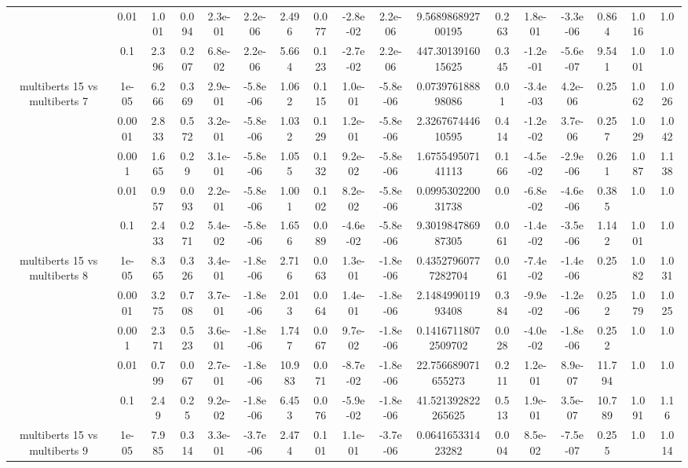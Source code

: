 \begin{tabular}{|c|c|c|c|c|c|c|c|c|c|c|c|c|c|c|c|c|}
 & 0.01 & 1.001 & 0.094 & 2.3e-01 & 2.2e-06 & 2.496 & 0.077 & -2.8e-02 & 2.2e-06 & 9.568986892700195 & 0.263 & 1.8e-01 & -3.3e-06 & 0.864 & 1.016 & 1.0 \\
 & 0.1 & 2.396 & 0.207 & 6.8e-02 & 2.2e-06 & 5.664 & 0.123 & -2.7e-02 & 2.2e-06 & 447.3013916015625 & 0.345 & -1.2e-01 & -5.6e-07 & 9.541 & 1.001 & 1.0 \\
\hline
\multirow{5}{*}{multiberts 15 vs multiberts 7} & 1e-05 & 6.266 & 0.369 & 2.9e-01 & -5.8e-06 & 1.062 & 0.115 & 1.0e-01 & -5.8e-06 & 0.073976188898086 & 0.01 & -3.4e-03 & 4.2e-06 & 0.25 & 1.062 & 1.026 \\
 & 0.0001 & 2.833 & 0.572 & 3.2e-01 & -5.8e-06 & 1.032 & 0.129 & 1.2e-01 & -5.8e-06 & 2.326767444610595 & 0.414 & -1.2e-02 & 3.7e-06 & 0.257 & 1.029 & 1.042 \\
 & 0.001 & 1.665 & 0.29 & 3.1e-01 & -5.8e-06 & 1.055 & 0.132 & 9.2e-02 & -5.8e-06 & 1.675549507141113 & 0.166 & -4.5e-02 & -2.9e-06 & 0.261 & 1.087 & 1.138 \\
 & 0.01 & 0.957 & 0.093 & 2.2e-01 & -5.8e-06 & 1.001 & 0.102 & 8.2e-02 & -5.8e-06 & 0.099530220031738 & 0.0 & -6.8e-02 & -4.6e-06 & 0.385 & 1.0 & 1.0 \\
 & 0.1 & 2.433 & 0.271 & 5.4e-02 & -5.8e-06 & 1.656 & 0.089 & -4.6e-02 & -5.8e-06 & 9.301984786987305 & 0.061 & -1.4e-02 & -3.5e-06 & 1.142 & 1.001 & 1.0 \\
\hline
\multirow{5}{*}{multiberts 15 vs multiberts 8} & 1e-05 & 8.365 & 0.326 & 3.4e-01 & -1.8e-06 & 2.716 & 0.063 & 1.3e-01 & -1.8e-06 & 0.43527960777282704 & 0.061 & -7.4e-02 & -1.4e-06 & 0.25 & 1.082 & 1.031 \\
 & 0.0001 & 3.275 & 0.708 & 3.7e-01 & -1.8e-06 & 2.013 & 0.064 & 1.4e-01 & -1.8e-06 & 2.148499011993408 & 0.384 & -9.9e-02 & -1.2e-06 & 0.252 & 1.079 & 1.025 \\
 & 0.001 & 2.371 & 0.523 & 3.6e-01 & -1.8e-06 & 1.747 & 0.067 & 9.7e-02 & -1.8e-06 & 0.14167118072509702 & 0.028 & -4.0e-02 & -1.8e-06 & 0.252 & 1.0 & 1.0 \\
 & 0.01 & 0.799 & 0.067 & 2.7e-01 & -1.8e-06 & 10.983 & 0.071 & -8.7e-02 & -1.8e-06 & 22.756689071655273 & 0.211 & 1.2e-01 & 8.9e-07 & 11.794 & 1.0 & 1.0 \\
 & 0.1 & 2.49 & 0.25 & 9.2e-02 & -1.8e-06 & 6.453 & 0.076 & -5.9e-02 & -1.8e-06 & 41.521392822265625 & 0.513 & 1.9e-01 & 3.5e-07 & 10.789 & 1.091 & 1.16 \\
\hline
\multirow{5}{*}{multiberts 15 vs multiberts 9} & 1e-05 & 7.985 & 0.314 & 3.3e-01 & -3.7e-06 & 2.474 & 0.101 & 1.1e-01 & -3.7e-06 & 0.064165331423282 & 0.004 & 8.5e-02 & -7.5e-07 & 0.255 & 1.0 & 1.014 \\

\end{tabular}
